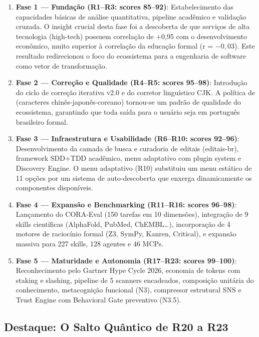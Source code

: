 \begin{enumerate}
  \item \textbf{Fase 1 --- Fundação (R1--R3: scores 85--92)}: Estabelecimento
        das capacidades básicas de análise quantitativa, pipeline acadêmico
        e validação cruzada. O insight crucial desta fase foi a descoberta de
        que serviços de alta tecnologia (high-tech) possuem correlação de
        +0,95 com o desenvolvimento econômico, muito superior à correlação
        da educação formal (r = $-0,03$). Este resultado redirecionou o foco
        do ecossistema para a engenharia de software como vetor de
        transformação.
  \item \textbf{Fase 2 --- Correção e Qualidade (R4--R5: scores 95--98)}:
        Introdução do ciclo de correção iterativa v2.0 e do corretor
        linguístico CJK. A política de  (caracteres chinês-japonês-coreano) tornou-se um
        padrão de qualidade do ecossistema, garantindo que toda saída para
        o usuário seja em português brasileiro formal.
  \item \textbf{Fase 3 --- Infraestrutura e Usabilidade (R6--R10: scores
        92--96)}: Desenvolvimento da camada de busca e curadoria de editais
        (editais-br), framework SDD+TDD acadêmico, menu adaptativo com
        plugin system e Discovery Engine. O menu adaptativo (R10) substituiu
        um menu estático de 11 opções por um sistema de auto-descoberta que
        enxerga dinamicamente os componentes disponíveis.
  \item \textbf{Fase 4 --- Expansão e Benchmarking (R11--R16: scores
        96--98)}: Lançamento do CORA-Eval (150 tarefas em 10 dimensões),
        integração de 9 skills científicas (AlphaFold, PubMed, ChEMBL\dots),
        incorporação de 4 motores de raciocínio formal (Z3, SymPy, Kanren,
        Critical), e expansão massiva para 227 skills, 128 agentes e 46
        MCPs.
  \item \textbf{Fase 5 --- Maturidade e Autonomia (R17--R23: scores
        99--100)}: Reconhecimento pelo Gartner Hype Cycle 2026, economia
        de tokens com staking e slashing, pipeline de 5 scanners
        encadeados, composição unitária do conhecimento, metacognição
        funcional (N3), compressor estrutural SNS e Trust Engine com
        Behavioral Gate preventivo (N3.5).
\end{enumerate}

\subsection{Destaque: O Salto Quântico de R20 a R23}

